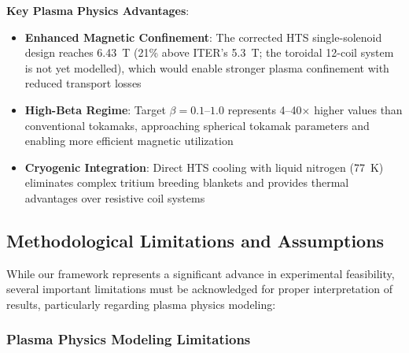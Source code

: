 \documentclass[10pt,twocolumn]{article}
\begin{document}
\textbf{Key Plasma Physics Advantages}:
\begin{itemize}
\item \textbf{Enhanced Magnetic Confinement}: The corrected HTS single-solenoid design reaches 6.43~T (21\% above ITER's 5.3~T; the toroidal 12-coil system is not yet modelled), which would enable stronger plasma confinement with reduced transport losses
\item \textbf{High-Beta Regime}: Target $\beta = 0.1$--$1.0$ represents 4--40× higher values than conventional tokamaks, approaching spherical tokamak parameters and enabling more efficient magnetic utilization
\item \textbf{Cryogenic Integration}: Direct HTS cooling with liquid nitrogen (77~K) eliminates complex tritium breeding blankets and provides thermal advantages over resistive coil systems
\end{itemize}

\subsection{Methodological Limitations and Assumptions}

While our framework represents a significant advance in experimental feasibility, several important limitations must be acknowledged for proper interpretation of results, particularly regarding plasma physics modeling:

\subsubsection{Plasma Physics Modeling Limitations}
\end{document}
